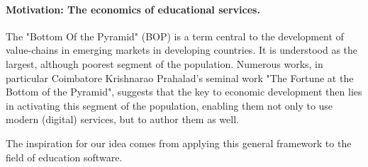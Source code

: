 \paragraph{Motivation: The economics of educational services.}

The "Bottom Of the Pyramid" (BOP) is a term central to the development of
value-chains in emerging markets in developing countries. It is understood as
the largest, although poorest segment of the population. Numerous works, in
particular Coimbatore Krishnarao Prahalad's seminal work "The Fortune at the
Bottom of the Pyramid", suggests that the key to economic development then lies
in activating this segment of the population, enabling them not only to use
modern (digital) services, but to author them as 
well\cite{prahalad2009fortune}.

The inspiration for our idea comes from applying this general framework to the
field of education software.
